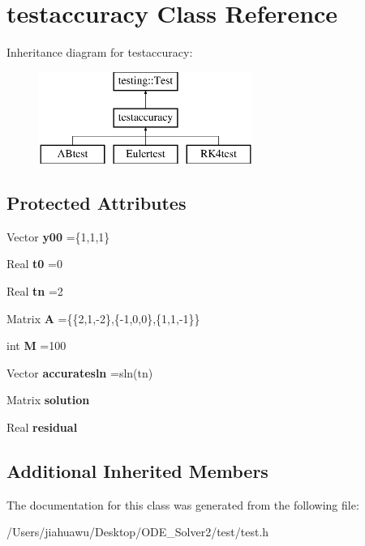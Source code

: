 \hypertarget{classtestaccuracy}{}\section{testaccuracy Class Reference}
\label{classtestaccuracy}
Inheritance diagram for testaccuracy\+:\begin{figure}[H]
\begin{center}
\leavevmode
\includegraphics[height=3.000000cm]{classtestaccuracy}
\end{center}
\end{figure}
\subsection*{Protected Attributes}
\begin{DoxyCompactItemize}
\item 
\mbox{\label{classtestaccuracy_a43673208dc9dc2c80a4f031232264925}} 
Vector {\bfseries y00} =\{1,1,1\}
\item 
\mbox{\label{classtestaccuracy_abcb540c18b0a9aaee3c6466ad6c76944}} 
Real {\bfseries t0} =0
\item 
\mbox{\label{classtestaccuracy_a5ce4227d4441bf0818cae2dde2e17552}} 
Real {\bfseries tn} =2
\item 
\mbox{\label{classtestaccuracy_a99ddf362fdf4bdd52e41f6de3a432363}} 
Matrix {\bfseries A} =\{\{2,1,-\/2\},\{-\/1,0,0\},\{1,1,-\/1\}\}
\item 
\mbox{\label{classtestaccuracy_a1716a10a99817a52885edccad5246cb3}} 
int {\bfseries M} =100
\item 
\mbox{\label{classtestaccuracy_aae4fa8bc83ff4315550cf05f826f106c}} 
Vector {\bfseries accuratesln} =sln(tn)
\item 
\mbox{\label{classtestaccuracy_a3c127b1551f71b33fd6fc692936cf8e0}} 
Matrix {\bfseries solution}
\item 
\mbox{\label{classtestaccuracy_a125396de84f2dbfaa06d2547debacbc4}} 
Real {\bfseries residual}
\end{DoxyCompactItemize}
\subsection*{Additional Inherited Members}


The documentation for this class was generated from the following file\+:\begin{DoxyCompactItemize}
\item 
/\+Users/jiahuawu/\+Desktop/\+O\+D\+E\+\_\+\+Solver2/test/test.\+h\end{DoxyCompactItemize}
